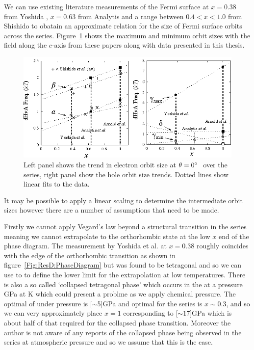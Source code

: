 We can use existing literature measurements of the Fermi surface at $x=0.38$ from Yoshida \etal \cite{Yoshida2010}, $x=0.63$ from Analytis \etal \cite{Analytis2010c} and a range between $0.4 < x < 1.0$ from Shishido \etal \cite{Shishido2010} to obatain an approximate relation for the size of Fermi surface orbits across the \BaFePAs series. Figure~\ref{Fig:ResD:SeriesRecipe} shows the maximum and minimum orbit sizes with the field along the $c$-axis from these papers along with data presented in this thesis.
\begin{figure}[htbp]
    \begin{center}
        \includegraphics[scale=1.1]{Chapter-dHvABaFe2P2/Figures/AngleDepMeasurements/SeriesRecipe/SeriesRecipe}
        \caption{Left panel shows the trend in electron orbit size at $\theta=0\degree$ over the series, right panel show the hole orbit size trends. Dotted lines show linear fits to the data.}
        \label{Fig:ResD:SeriesRecipe}
    \end{center}
\end{figure}
It may be possible to apply a linear scaling to determine the intermediate orbit sizes however there are a number of assumptions that need to be made. 

Firstly we cannot apply Vegard's law beyond a structural transition in the series meaning we cannot extrapolate to the orthorhombic state at the low $x$ end of the phase diagram. The measurement by Yoshida et al. at $x=0.38$ roughly coincides with the edge of the orthorhombic transition as shown in figure~\ref{Fig:ResD:PhaseDiagram} but was found to be tetragonal and so we can use to to define the lower limit for the extrapolation at low temperatures. There is also a so called `collapsed tetragonal phase' which occurs in the \BaFeAs at a pressure \unit[27]{GPa}\cite{Mittal2011} at \unit[33]{K} which could present a problme as we apply chemical pressure. The optimal \Tc of \BaFeAs under pressure is \unit[$\sim$5]{GPa}\cite{Colombier2009} and optimal \Tc for the \BaFePAs series is $x\sim0.3$, and so we can very approximately place $x=1$ corresponding to \unit[$\sim 17$]{GPa} which is about half of that required for the collapsed phase transition. Moreover the author is not aware of any reports of the collapsed phase being observed in the \BaFePAs series at atmospheric pressure and so we assume that this is the case. 

